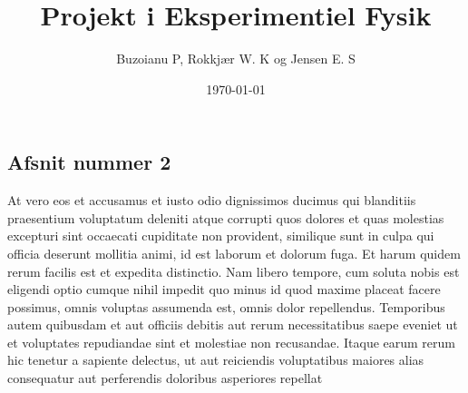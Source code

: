 \documentclass{memoir}
\author{Buzoianu P, Rokkjær W. K og Jensen E. S}
\title{Projekt i Eksperimentiel Fysik}
\date{\today}
\begin{document}
    \maketitle
    \subsection*{Afsnit nummer 2}
    At vero eos et accusamus et iusto odio dignissimos ducimus qui blanditiis praesentium voluptatum deleniti atque corrupti quos dolores et quas molestias excepturi sint occaecati cupiditate non provident, 
    similique sunt in culpa qui officia deserunt mollitia animi, id est laborum et dolorum fuga. 
    Et harum quidem rerum facilis est et expedita distinctio. 
    Nam libero tempore, cum soluta nobis est eligendi optio cumque nihil impedit quo minus id quod maxime placeat facere possimus, 
    omnis voluptas assumenda est, omnis dolor repellendus. 
    Temporibus autem quibusdam et aut officiis debitis aut rerum necessitatibus saepe eveniet ut et voluptates repudiandae sint et molestiae non recusandae. 
    Itaque earum rerum hic tenetur a sapiente delectus, ut aut reiciendis voluptatibus maiores alias consequatur aut perferendis doloribus asperiores repellat
\end{document}
